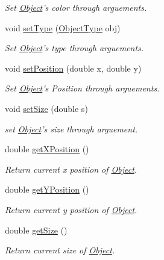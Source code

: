 \begin{DoxyCompactItemize}
\begin{DoxyCompactList}\small\item\em Set \hyperlink{classObject}{Object}'s color through arguements. \end{DoxyCompactList}\item 
void \hyperlink{classObject_a91f40854ef8471bdc38d8b3848e3c25a}{set\-Type} (\hyperlink{Object_8h_a842c5e2e69277690b064bf363c017980}{Object\-Type} obj)
\begin{DoxyCompactList}\small\item\em Set \hyperlink{classObject}{Object}'s type through arguements. \end{DoxyCompactList}\item 
void \hyperlink{classObject_a31495a5948411e2cb7b10e2c211b2f9b}{set\-Position} (double x, double y)
\begin{DoxyCompactList}\small\item\em Set \hyperlink{classObject}{Object}'s Position through arguements. \end{DoxyCompactList}\item 
void \hyperlink{classObject_a0ade9aa73271d6ec7aa9bf6b0d458270}{set\-Size} (double s)
\begin{DoxyCompactList}\small\item\em set \hyperlink{classObject}{Object}'s size through arguement. \end{DoxyCompactList}\item 
double \hyperlink{classObject_a82313b69986eebc7e2dff3925e2684b2}{get\-X\-Position} ()
\begin{DoxyCompactList}\small\item\em Return current x position of \hyperlink{classObject}{Object}. \end{DoxyCompactList}\item 
double \hyperlink{classObject_aa2816e5e411b0bc1179a2762f7e2b552}{get\-Y\-Position} ()
\begin{DoxyCompactList}\small\item\em Return current y position of \hyperlink{classObject}{Object}. \end{DoxyCompactList}\item 
double \hyperlink{classObject_aa45378bcd52e52cae8070de90b2b1148}{get\-Size} ()
\begin{DoxyCompactList}\small\item\em Return current size of \hyperlink{classObject}{Object}. \end{DoxyCompactList}\item 

\end{DoxyCompactItemize}
